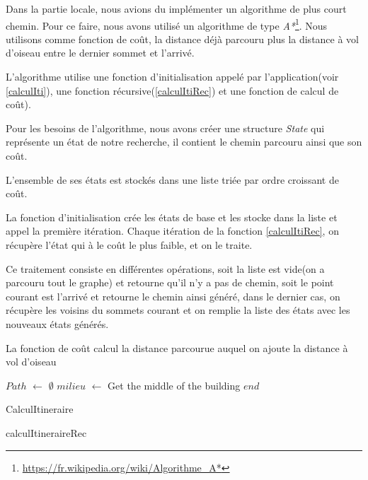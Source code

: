 Dans la partie locale, nous avions du implémenter un algorithme de plus court chemin. Pour ce faire, nous avons utilisé un algorithme de type \emph{A*}\footnote{\url{https://fr.wikipedia.org/wiki/Algorithme_A*}}. Nous utilisons comme fonction de co\^{u}t, la distance déjà parcouru plus la distance à vol d'oiseau entre le dernier sommet et l'arrivé.

L'algorithme utilise une fonction d'initialisation appelé par l'application(voir \ref{calculIti}), une fonction récursive(\ref{calculItiRec}) et une fonction de calcul de co\^{u}t).

Pour les besoins de l'algorithme, nous avons créer une structure \emph{State} qui représente un état de notre recherche, il contient le chemin parcouru ainsi que son co\^{u}t.

L'ensemble de ses états est stockés dans une liste triée par ordre croissant de co\^{u}t.

La fonction d'initialisation crée les états de base et les stocke dans la liste et appel la première itération. Chaque itération de la fonction \ref{calculItiRec}, on récupère l'état qui à le co\^{u}t le plus faible, et on le traite.

Ce traitement consiste en différentes opérations, soit la liste est vide(on a parcouru tout le graphe) et retourne qu'il n'y a pas de chemin, soit le point courant est l'arrivé et retourne le chemin ainsi généré, dans le dernier cas, on récupère les voisins du sommets courant et on remplie la liste des états avec les nouveaux états générés.

La fonction de coût calcul la distance parcourue auquel on ajoute la distance à vol d'oiseau 
\begin{algorithm}[H]
 $Path$ $\gets$ $\emptyset$\;
 $milieu$ $\gets$ Get the middle of the building $end$\;
 
 \caption{CalculItineraire\label{calculIti}}
\end{algorithm}

\begin{algorithm}[H]
\caption{calculItineraireRec\label{calculItiRec}}
\end{algorithm}
